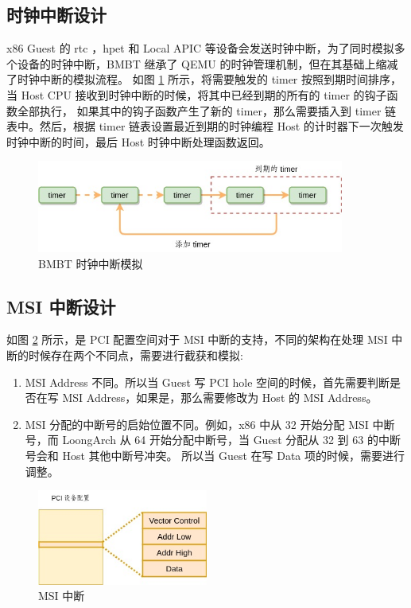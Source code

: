 \subsection{时钟中断设计}
x86 Guest 的 rtc ，hpet 和 Local APIC 等设备会发送时钟中断，为了同时模拟多个设备的时钟中断，BMBT 继承了 QEMU 的时钟管理机制，但在其基础上缩减了时钟中断的模拟流程。
如图 \ref{fig:timer_interrupt} 所示，将需要触发的 timer 按照到期时间排序，当 Host CPU 接收到时钟中断的时候，将其中已经到期的所有的 timer 的钩子函数全部执行，
如果其中的钩子函数产生了新的 timer，那么需要插入到 timer 链表中。然后，根据 timer 链表设置最近到期的时钟编程 Host 的计时器下一次触发时钟中断的时间，最后 Host 时钟中断处理函数返回。

\begin{figure}[!htbp]
	\centering
	\includegraphics[width=0.9\textwidth]{./images/timer-interrupt.jpg}
	\caption{BMBT 时钟中断模拟}
	\label{fig:timer_interrupt}
\end{figure}

\subsection{MSI 中断设计}
如图 \ref{fig:msi} 所示，是 PCI 配置空间对于 MSI 中断的支持，不同的架构在处理 MSI 中断的时候存在两个不同点，需要进行截获和模拟:
\begin{enumerate}
	\item MSI Address 不同。所以当 Guest 写 PCI hole 空间的时候，首先需要判断是否在写 MSI Address，如果是，那么需要修改为 Host 的 MSI Address。
	\item MSI 分配的中断号的启始位置不同。例如，x86 中从 32 开始分配 MSI 中断号，而 LoongArch 从 64 开始分配中断号，当 Guest 分配从 32 到 63 的中断号会和 Host 其他中断号冲突。
	      所以当 Guest 在写 Data 项的时候，需要进行调整。
\end{enumerate}
\begin{figure}[!htbp]
	\centering
	\includegraphics[width=0.5\textwidth]{./images/MSI.jpg}
	\caption{MSI 中断}
	\label{fig:msi}
\end{figure}

